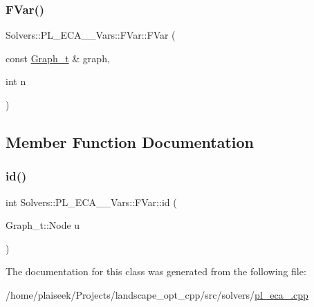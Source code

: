 \subsubsection{\texorpdfstring{F\+Var()}{FVar()}}
{\footnotesize\ttfamily Solvers\+::\+P\+L\+\_\+\+E\+C\+A\+\_\+\_\+\+Vars\+::\+F\+Var\+::\+F\+Var (\begin{DoxyParamCaption}\item[{const \hyperlink{pl__reff_8cpp_a65aea14f39d53b24df9910d54216d620}{Graph\+\_\+t} \&}]{graph,  }\item[{int}]{n }\end{DoxyParamCaption})\hspace{0.3cm}{\ttfamily [inline]}}



\subsection{Member Function Documentation}
\mbox{\label{class_solvers_1_1_p_l___e_c_a__2___vars_1_1_f_var_a3e092894e61d1d3a09431d021a3d2cde}} 
\subsubsection{\texorpdfstring{id()}{id()}}
{\footnotesize\ttfamily int Solvers\+::\+P\+L\+\_\+\+E\+C\+A\+\_\+\_\+\+Vars\+::\+F\+Var\+::id (\begin{DoxyParamCaption}\item[{Graph\+\_\+t\+::\+Node}]{u }\end{DoxyParamCaption})\hspace{0.3cm}{\ttfamily [inline]}}



The documentation for this class was generated from the following file\+:\begin{DoxyCompactItemize}
\item 
/home/plaiseek/\+Projects/landscape\+\_\+opt\+\_\+cpp/src/solvers/\hyperlink{pl__eca__2_8cpp}{pl\+\_\+eca\+\_.\+cpp}\end{DoxyCompactItemize}
